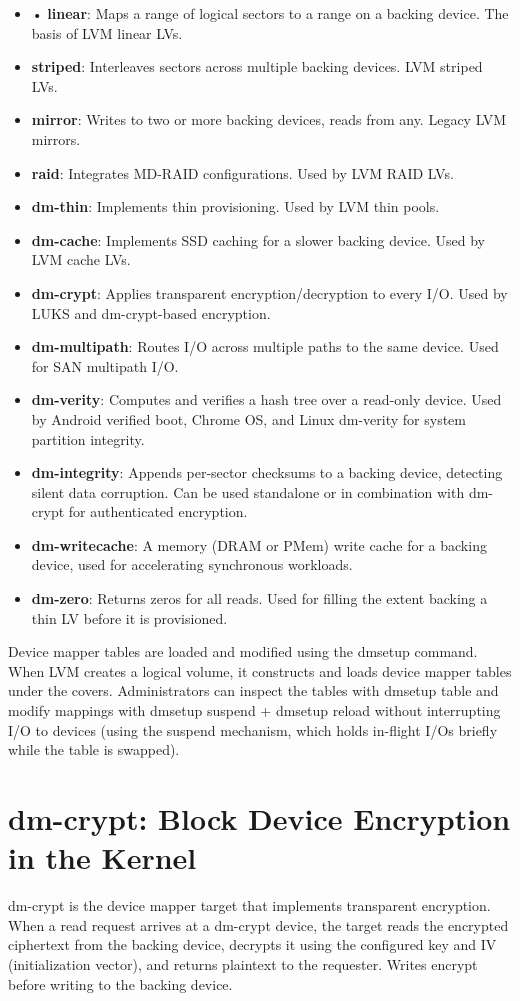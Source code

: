 \begin{itemize}
  \item • \textbf{linear}: Maps a range of logical sectors to a range on a backing device. The basis of LVM linear LVs.
  \item \textbf{striped}: Interleaves sectors across multiple backing devices. LVM striped LVs.
  \item \textbf{mirror}: Writes to two or more backing devices, reads from any. Legacy LVM mirrors.
  \item \textbf{raid}: Integrates MD-RAID configurations. Used by LVM RAID LVs.
  \item \textbf{dm-thin}: Implements thin provisioning. Used by LVM thin pools.
  \item \textbf{dm-cache}: Implements SSD caching for a slower backing device. Used by LVM cache LVs.
  \item \textbf{dm-crypt}: Applies transparent encryption/decryption to every I/O. Used by LUKS and dm-crypt-based encryption.
  \item \textbf{dm-multipath}: Routes I/O across multiple paths to the same device. Used for SAN multipath I/O.
  \item \textbf{dm-verity}: Computes and verifies a hash tree over a read-only device. Used by Android verified boot, Chrome OS, and Linux dm-verity for system partition integrity.
  \item \textbf{dm-integrity}: Appends per-sector checksums to a backing device, detecting silent data corruption. Can be used standalone or in combination with dm-crypt for authenticated encryption.
  \item \textbf{dm-writecache}: A memory (DRAM or PMem) write cache for a backing device, used for accelerating synchronous workloads.
  \item \textbf{dm-zero}: Returns zeros for all reads. Used for filling the extent backing a thin LV before it is provisioned.
\end{itemize}

Device mapper tables are loaded and modified using the dmsetup command. When LVM creates a logical volume, it constructs and loads device mapper tables under the covers. Administrators can inspect the tables with dmsetup table and modify mappings with dmsetup suspend + dmsetup reload without interrupting I/O to devices (using the suspend mechanism, which holds in-flight I/Os briefly while the table is swapped).

\section{dm-crypt: Block Device Encryption in the Kernel}
dm-crypt is the device mapper target that implements transparent encryption. When a read request arrives at a dm-crypt device, the target reads the encrypted ciphertext from the backing device, decrypts it using the configured key and IV (initialization vector), and returns plaintext to the requester. Writes encrypt before writing to the backing device.

